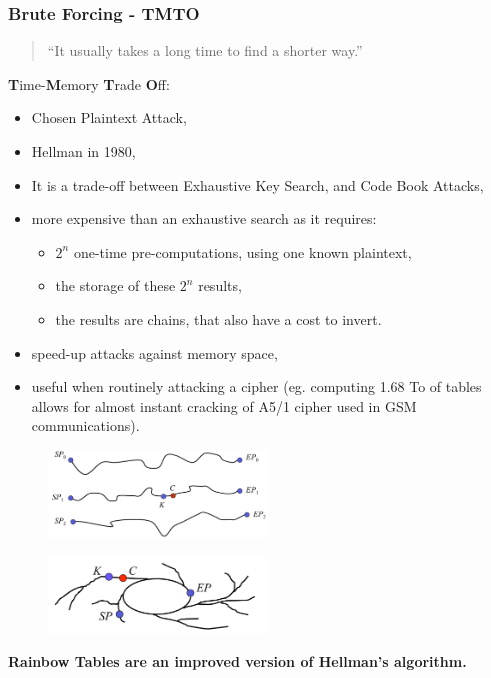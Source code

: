 \begin{frame}[allowframebreaks]
        \frametitle{Brute Forcing - TMTO}
\begin{quote}
  ``It usually takes a long time to find a shorter way.''
\end{quote}
        {\bf T}ime-{\bf M}emory {\bf T}rade {\bf O}ff:
        \begin{itemize}
         \item Chosen Plaintext Attack,
         \item Hellman in 1980,
         \item It is a trade-off between Exhaustive Key Search, and Code Book Attacks,
         \item more expensive than an exhaustive search as it requires:
        \begin{itemize}
        \item $2^{n}$ one-time pre-computations, using one known plaintext,
        \item the storage of these $2^{n}$ results,
        \item the results are chains, that also have a cost to invert.
        \end{itemize}
         \item speed-up attacks against memory space,
         \item useful when routinely attacking a cipher (eg. computing 1.68 To of tables allows for almost instant cracking of A5/1 cipher used in GSM communications).
        \end{itemize}
        
            \begin{figure}[h!]
              \includegraphics[width=220px]{./chains1.png}
            \end{figure}


            \begin{figure}[h!]
              \includegraphics[width=220px]{./chains2.png}
            \end{figure}

        {\bf Rainbow Tables are an improved version of Hellman's algorithm.}
\end{frame}

